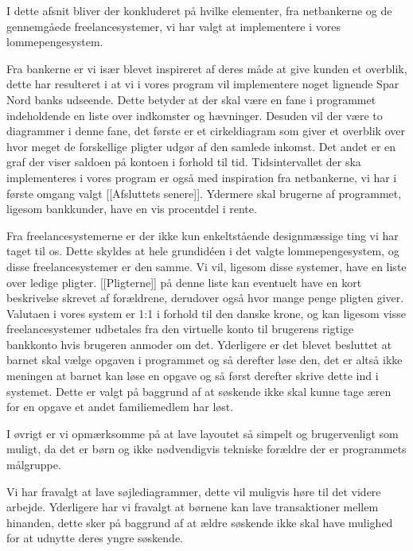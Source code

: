 I dette afsnit bliver der konkluderet på hvilke elementer, fra netbankerne og de gennemgåede freelancesystemer, vi har valgt at implementere i vores lommepengesystem.

Fra bankerne er vi især blevet inspireret af deres måde at give kunden et overblik, dette har resulteret i at vi i vores program vil implementere noget lignende Spar Nord banks udseende. Dette betyder at der skal være en fane i programmet indeholdende en liste over indkomster og hævninger. Desuden vil der være to diagrammer i denne fane, det første er et cirkeldiagram som giver et overblik over hvor meget de forskellige pligter udgør af den samlede inkomst. Det andet er en graf der viser saldoen på kontoen i forhold til tid. Tidsintervallet der ska implementeres i vores program er også med inspiration fra netbankerne, vi har i første omgang valgt [[Afsluttets senere]]. Ydermere skal brugerne af programmet, ligesom bankkunder, have en vis procentdel i rente.

Fra freelancesystemerne er der ikke kun enkeltstående designmæssige ting vi har taget til os. Dette skyldes at hele grundidéen i det  valgte lommepengesystem, og disse freelancesystemer er den samme. Vi  vil, ligesom disse systemer, have en liste over ledige pligter. [[Pligterne]] på denne liste kan eventuelt have en kort beskrivelse skrevet af forældrene, derudover også hvor mange penge pligten giver. Valutaen i vores system er 1:1 i forhold til den danske krone, og kan ligesom visse freelancesystemer udbetales fra den virtuelle konto til brugerens rigtige bankkonto hvis brugeren anmoder om det. Yderligere er det blevet besluttet at barnet skal vælge opgaven i programmet og så derefter løse den, det er altså ikke meningen at barnet kan løse en opgave og så først derefter skrive dette ind i systemet. Dette er valgt på baggrund af at søskende ikke skal kunne tage æren for en opgave et andet familiemedlem har løst.

I øvrigt er vi opmærksomme på at lave layoutet så simpelt og brugervenligt som muligt, da det er børn og ikke nødvendigvis tekniske forældre der er programmets målgruppe. 

Vi har fravalgt at lave søjlediagrammer, dette vil muligvis høre til det videre arbejde. Yderligere har vi fravalgt at børnene kan lave transaktioner mellem hinanden, dette sker på baggrund af at ældre søskende ikke skal have mulighed for at udnytte deres yngre søskende.




